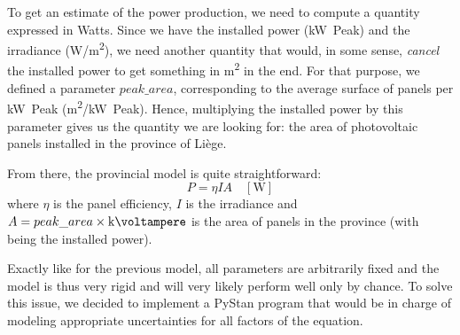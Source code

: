 \documentclass[a4paper, 12pt]{article}
\begin{document}
To get an estimate of the power production, we need to compute a quantity expressed in Watts. Since we have the installed power (\si{\kilo\watt Peak}) and the irradiance (\si{\watt/\meter\squared}), we need another quantity that would, in some sense, \emph{cancel} the installed power to get something in \si{\meter\squared} in the end. For that purpose, we defined a parameter $peak\_area$, corresponding to the average surface of panels per \si{\kilo\watt Peak} (\si{\meter\squared/\kilo\watt Peak}). Hence, multiplying the installed power by this parameter gives us the quantity we are looking for: the area of photovoltaic panels installed in the province of Liège.

From there, the provincial model is quite straightforward:
\begin{equation}
    P = \eta I A \quad [\si{\watt}]
\end{equation}
where $\eta$ is the panel efficiency, $I$ is the irradiance and $A = peak\_area \times \si{\kilo\voltampere}$ is the area of panels in the province (with \si{\kilo\voltampere} being the installed power).

Exactly like for the previous model, all parameters are arbitrarily fixed and the model is thus very rigid and will very likely perform well only by chance. To solve this issue, we decided to implement a PyStan program that would be in charge of modeling appropriate uncertainties for all factors of the equation. 
\end{document}
